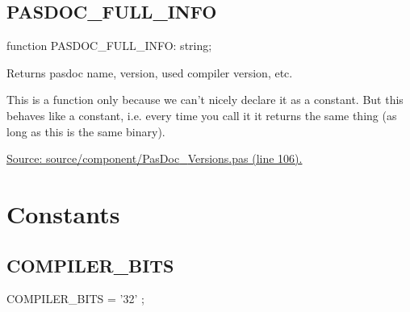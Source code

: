 \documentclass{report}
\newif\ifpdf
\begin{document}
\subsection*{PASDOC{\_}FULL{\_}INFO}
\fi
\label{PasDoc_Versions-PASDOC_FULL_INFO}
\begin{list}{}{
\setlength{\itemindent}{0cm}
\setlength{\listparindent}{0cm}
\setlength{\leftmargin}{\evensidemargin}
\addtolength{\leftmargin}{\tmplength}
\settowidth{\labelsep}{X}
\addtolength{\leftmargin}{\labelsep}
\setlength{\labelwidth}{\tmplength}
}
\item[\textbf{Declaration}\hfill]
\ifpdf
\begin{flushleft}
\fi
\begin{ttfamily}
function PASDOC{\_}FULL{\_}INFO: string;\end{ttfamily}

\ifpdf
\end{flushleft}
\fi

\par
\item[\textbf{Description}]
Returns pasdoc name, version, used compiler version, etc.

This is a function only because we can't nicely declare it as a constant. But this behaves like a constant, i.e. every time you call it it returns the same thing (as long as this is the same binary).\par
\href{https://github.com/pasdoc/pasdoc/blob/master/source/component/PasDoc_Versions.pas#L106}{Source: source/component/PasDoc{\_}Versions.pas (line 106).}

\end{list}
\section{Constants}
\ifpdf
\subsection*{\large{\textbf{COMPILER{\_}BITS}}\normalsize\hspace{1ex}\hrulefill}
\else
\subsection*{COMPILER{\_}BITS}
\fi
\label{PasDoc_Versions-COMPILER_BITS}
\begin{list}{}{
\setlength{\itemindent}{0cm}
\setlength{\listparindent}{0cm}
\setlength{\leftmargin}{\evensidemargin}
\addtolength{\leftmargin}{\tmplength}
\settowidth{\labelsep}{X}
\addtolength{\leftmargin}{\labelsep}
\setlength{\labelwidth}{\tmplength}
}
\item[\textbf{Declaration}\hfill]
\ifpdf
\begin{flushleft}
\fi
\begin{ttfamily}
COMPILER{\_}BITS =   '32' ;\end{ttfamily}

\ifpdf
\end{flushleft}
\fi

\end{list}
\ifpdf
\end{document}
